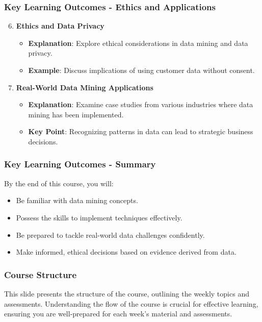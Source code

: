 \documentclass[aspectratio=169]{beamer}
\begin{document}
\begin{frame}[fragile]
    \frametitle{Key Learning Outcomes - Ethics and Applications}
    \begin{enumerate}
        \setcounter{enumi}{5} %
        \item \textbf{Ethics and Data Privacy}  
          \begin{itemize}
              \item \textbf{Explanation}: Explore ethical considerations in data mining and data privacy.
              \item \textbf{Example}: Discuss implications of using customer data without consent.
          \end{itemize}
          
        \item \textbf{Real-World Data Mining Applications}  
          \begin{itemize}
              \item \textbf{Explanation}: Examine case studies from various industries where data mining has been implemented.
              \item \textbf{Key Point}: Recognizing patterns in data can lead to strategic business decisions.
          \end{itemize}
    \end{enumerate}
\end{frame}

\begin{frame}[fragile]
    \frametitle{Key Learning Outcomes - Summary}
    By the end of this course, you will:
    \begin{itemize}
        \item Be familiar with data mining concepts.
        \item Possess the skills to implement techniques effectively.
        \item Be prepared to tackle real-world data challenges confidently.
        \item Make informed, ethical decisions based on evidence derived from data.
    \end{itemize}
\end{frame}

\begin{frame}[fragile]
    \frametitle{Course Structure}
    This slide presents the structure of the course, outlining the weekly topics and assessments. Understanding the flow of the course is crucial for effective learning, ensuring you are well-prepared for each week’s material and assessments.
\end{frame}
\end{document}
